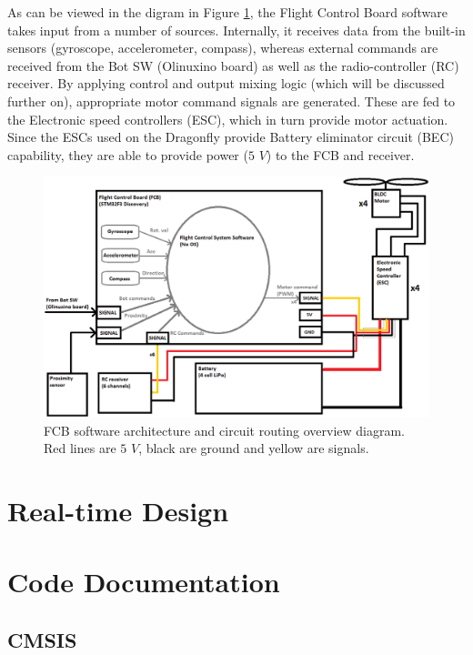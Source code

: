 \documentclass[a4paper]{report}
\begin{document}
As can be viewed in the digram in Figure \ref{fig:fcb-sw-hw-arch}, the Flight Control Board software takes input from a number of sources. Internally, it receives data from the built-in sensors (gyroscope, accelerometer, compass), whereas external commands are received from the Bot SW (Olinuxino board) as well as the radio-controller (RC) receiver. By applying control and output mixing logic (which will be discussed further on), appropriate motor command signals are generated. These are fed to the Electronic speed controllers (ESC), which in turn provide motor actuation. Since the ESCs used on the Dragonfly provide Battery eliminator circuit (BEC) capability, they are able to provide power ($5$ $V$) to the FCB and receiver.

\begin{figure}[h]
    \centering
    \includegraphics[scale=0.42]{images/fcb-sw-hw-design.png}
    \caption{FCB software architecture and circuit routing overview diagram. Red lines are $5$ $V$, black are ground and yellow are signals.}
    \label{fig:fcb-sw-hw-arch}
\end{figure}

	\section{Real-time Design}

	\section{Code Documentation}

		\subsection{CMSIS}
\end{document}
